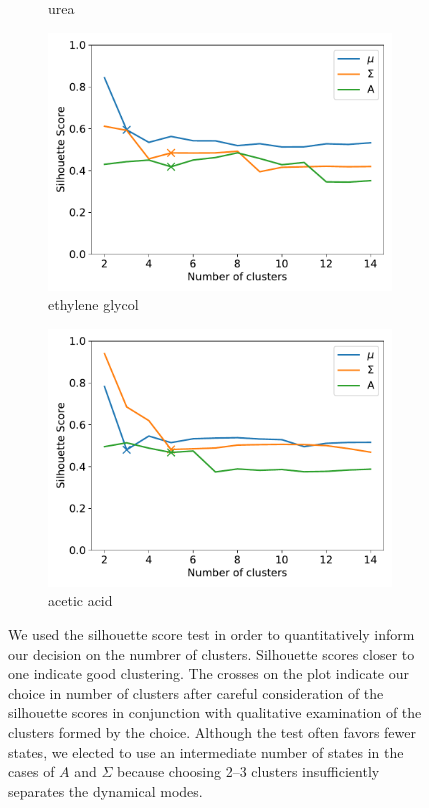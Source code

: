 \documentclass{article}
\begin{document}
\begin{figure}[h]
\begin{subfigure}{0.45\textwidth}
  \caption{urea}\label{fig:silhouette_URE}
  \end{subfigure}
  \begin{subfigure}{0.45\textwidth}
  \includegraphics[width=\textwidth]{silhouette_GCL.pdf}
  \caption{ethylene glycol}\label{fig:silhouette_GCL}
  \end{subfigure}
  \begin{subfigure}{0.45\textwidth}
  \includegraphics[width=\textwidth]{silhouette_ACH.pdf}
  \caption{acetic acid}\label{fig:silhouette_ACH}
  \end{subfigure}
  \caption{We used the silhouette score test in order to quantitatively
  inform our decision on the numbrer of clusters. Silhouette scores 
  closer to one indicate good clustering. The crosses on the plot indicate
  our choice in number of clusters after careful consideration of the
  silhouette scores in conjunction with qualitative examination of the clusters
  formed by the choice. Although the test often
  favors fewer states, we elected to use an intermediate number of states in 
  the cases of $A$ and $\Sigma$ because choosing 2--3 clusters 
  insufficiently separates the dynamical modes. }\label{fig:silhouette}
  \end{figure}
  
\end{document}
